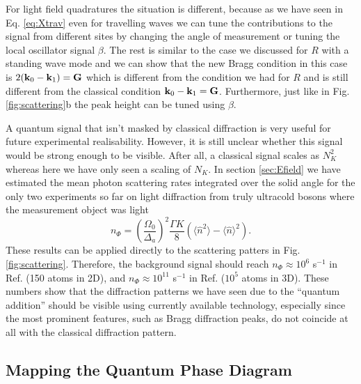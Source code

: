 For light field quadratures the situation is different, because as we
have seen in Eq. \eqref{eq:Xtrav} even for travelling waves we can
tune the contributions to the signal from different sites by changing
the angle of measurement or tuning the local oscillator signal
$\beta$. The rest is similar to the case we discussed for $R$ with a
standing wave mode and we can show that the new Bragg condition in
this case is $2 (\mathbf{k}_0 - \mathbf{k}_1) = \mathbf{G}$ which is different from
the condition we had for $R$ and is still different from the classical
condition $\mathbf{k}_0 - \mathbf{k}_1 = \mathbf{G}$. Furthermore, just like in
Fig. \ref{fig:scattering}b the peak height can be tuned using $\beta$.

A quantum signal that isn't masked by classical diffraction is very
useful for future experimental realisability. However, it is still
unclear whether this signal would be strong enough to be
visible. After all, a classical signal scales as $N_K^2$ whereas here
we have only seen a scaling of $N_K$. In section \ref{sec:Efield} we
have estimated the mean photon scattering rates integrated over the
solid angle for the only two experiments so far on light diffraction
from truly ultracold bosons where the measurement object was light
\begin{equation} 
  n_{\Phi}= \left(\frac{\Omega_0}{\Delta_a}\right)^2 \frac{\Gamma K}{8}
  (\langle\hat{n}^2\rangle-\langle\hat{n}\rangle^2).
\end{equation} 
These results can be applied directly to the scattering patters in
Fig. \ref{fig:scattering}. Therefore, the background signal should
reach $n_\Phi \approx 10^6$ s$^{-1}$ in Ref. \cite{weitenberg2011}
(150 atoms in 2D), and $n_\Phi \approx 10^{11}$ s$^{-1}$ in
Ref. \cite{miyake2011} ($10^5$ atoms in 3D). These numbers show that
the diffraction patterns we have seen due to the ``quantum addition''
should be visible using currently available technology, especially
since the most prominent features, such as Bragg diffraction peaks, do
not coincide at all with the classical diffraction pattern.

\subsection{Mapping the Quantum Phase Diagram}

